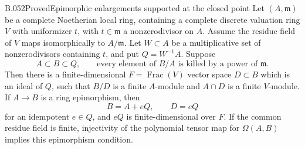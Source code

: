 \begin{saresult}{B.052}{Proved}{Epimorphic enlargements supported at the closed point}
Let $(A,\mathfrak m)$ be a complete Noetherian local
ring, containing a complete discrete valuation ring
$V$ with uniformizer $t$, with $t\in\mathfrak m$
a nonzerodivisor on $A$. Assume the residue field
of $V$ maps isomorphically to $A/\mathfrak m$.
Let $W\subset A$ be a multiplicative set of
nonzerodivisors containing $t$, and put $Q=W^{-1}A$.
Suppose
\[
 A\subset B\subset Q,\qquad
 \text{every element of }B/A\text{ is killed by a power
 of }\mathfrak m.
\]
Then there is a finite-dimensional
$F=\operatorname{Frac}(V)$ vector space $D\subset B$
which is an ideal of $Q$, such that $B/D$ is a finite
$A$-module and $A\cap D$ is a finite $V$-module.
If $A\to B$ is a ring epimorphism, then
\[
                         B=A+eQ,\qquad D=eQ                 \tag{B52.1}
\]
for an idempotent $e\in Q$, and $eQ$ is finite-dimensional
over $F$. If the common residue field is finite,
injectivity of the polynomial tensor map for
$\Omega(A,B)$ implies this epimorphism condition.
\end{saresult}

